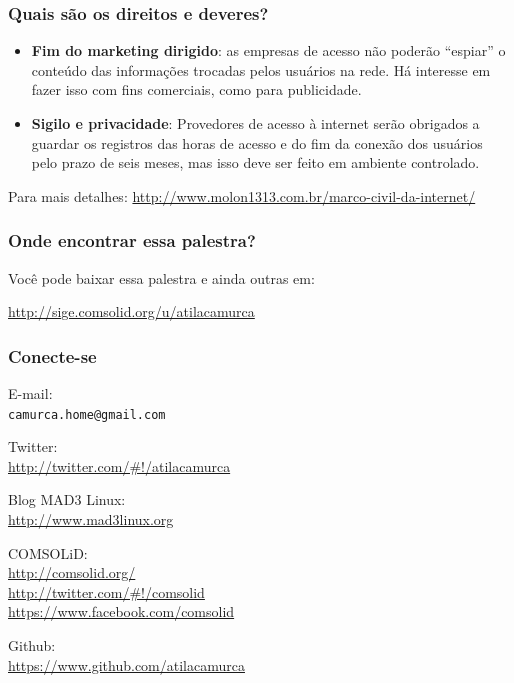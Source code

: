 \begin{frame}[fragile]\frametitle{Quais são os direitos e deveres?}

\begin{itemize}
\item
  \textbf{Fim do marketing dirigido}: as empresas de acesso não poderão
  ``espiar'' o conteúdo das informações trocadas pelos usuários na rede.
  Há interesse em fazer isso com fins comerciais, como para publicidade.
\item
  \textbf{Sigilo e privacidade}: Provedores de acesso à internet serão
  obrigados a guardar os registros das horas de acesso e do fim da
  conexão dos usuários pelo prazo de seis meses, mas isso deve ser feito
  em ambiente controlado.
\end{itemize}
Para mais detalhes:
\url{http://www.molon1313.com.br/marco-civil-da-internet/}

\end{frame}

\begin{frame}\frametitle{Onde encontrar essa palestra?}

\begin{center}
Você pode baixar essa palestra e ainda outras em:

\bigskip

\large{\url{http://sige.comsolid.org/u/atilacamurca}}
\end{center}

\end{frame}

\begin{frame}\frametitle{}


\end{frame}

\begin{frame}\frametitle{Conecte-se}

\begin{center}
E-mail:\\
\texttt{camurca.home@gmail.com}

\medskip

Twitter:\\
\url{http://twitter.com/\#!/atilacamurca}

\medskip

Blog MAD3 Linux:\\
\url{http://www.mad3linux.org}

\medskip

COMSOLiD:\\
\url{http://comsolid.org/}\\
\url{http://twitter.com/\#!/comsolid}\\
\url{https://www.facebook.com/comsolid}

\medskip

Github:\\
\url{https://www.github.com/atilacamurca}
\end{center}

\end{frame}
